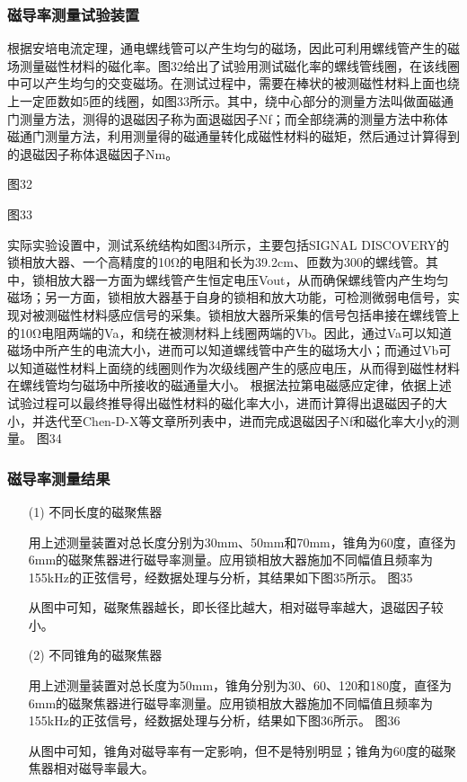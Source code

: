 \documentclass[a4paper,12pt，twoside]{ctexart}
\begin{document}
	\subsubsection{磁导率测量试验装置}
	根据安培电流定理，通电螺线管可以产生均匀的磁场，因此可利用螺线管产生的磁场测量磁性材料的磁化率。图32给出了试验用测试磁化率的螺线管线圈，在该线圈中可以产生均匀的交变磁场。在测试过程中，需要在棒状的被测磁性材料上面也绕上一定匝数如5匝的线圈，如图33所示。其中，绕中心部分的测量方法叫做面磁通门测量方法，测得的退磁因子称为面退磁因子Nf；而全部绕满的测量方法中称体磁通门测量方法，利用测量得的磁通量转化成磁性材料的磁矩，然后通过计算得到的退磁因子称体退磁因子Nm。
	
	图32\par 
	图33\par 
	实际实验设置中，测试系统结构如图34所示，主要包括SIGNAL DISCOVERY的锁相放大器、一个高精度的10Ω的电阻和长为39.2cm、匝数为300的螺线管。其中，锁相放大器一方面为螺线管产生恒定电压Vout，从而确保螺线管内产生均匀磁场；另一方面，锁相放大器基于自身的锁相和放大功能，可检测微弱电信号，实现对被测磁性材料感应信号的采集。锁相放大器所采集的信号包括串接在螺线管上的10Ω电阻两端的Va，和绕在被测材料上线圈两端的Vb。因此，通过Va可以知道磁场中所产生的电流大小，进而可以知道螺线管中产生的磁场大小；而通过Vb可以知道磁性材料上面绕的线圈则作为次级线圈产生的感应电压，从而得到磁性材料在螺线管均匀磁场中所接收的磁通量大小。
	根据法拉第电磁感应定律，依据上述试验过程可以最终推导得出磁性材料的磁化率大小，进而计算得出退磁因子的大小，并迭代至Chen-D-X等文章所列表中，进而完成退磁因子Nf和磁化率大小χ的测量。
	图34\par 
	
	\subsubsection{磁导率测量结果}
	\begin{enumerate}
		\item [(1)]不同长度的磁聚焦器\par 
		用上述测量装置对总长度分别为30mm、50mm和70mm，锥角为60度，直径为6mm的磁聚焦器进行磁导率测量。应用锁相放大器施加不同幅值且频率为155kHz的正弦信号，经数据处理与分析，其结果如下图35所示。
		图35\par 
		从图中可知，磁聚焦器越长，即长径比越大，相对磁导率越大，退磁因子较小。
		\item [(2)]不同锥角的磁聚焦器\par 
		用上述测量装置对总长度为50mm，锥角分别为30、60、120和180度，直径为6mm的磁聚焦器进行磁导率测量。应用锁相放大器施加不同幅值且频率为155kHz的正弦信号，经数据处理与分析，结果如下图36所示。
		图36\par 
		从图中可知，锥角对磁导率有一定影响，但不是特别明显；锥角为60度的磁聚焦器相对磁导率最大。
	\end{enumerate}
	
\end{document}
